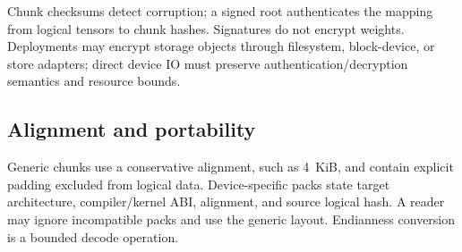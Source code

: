 Chunk checksums detect corruption; a signed root authenticates the mapping from logical tensors to chunk hashes. Signatures do not encrypt weights. Deployments may encrypt storage objects through filesystem, block-device, or store adapters; direct device IO must preserve authentication/decryption semantics and resource bounds.

\subsection{Alignment and portability}

Generic chunks use a conservative alignment, such as 4~KiB, and contain explicit padding excluded from logical data. Device-specific packs state target architecture, compiler/kernel ABI, alignment, and source logical hash. A reader may ignore incompatible packs and use the generic layout. Endianness conversion is a bounded decode operation.
